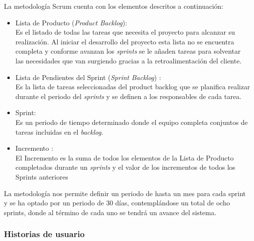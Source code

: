 \noindent La metodología Scrum cuenta con los elementos descritos a continuación:

\begin{itemize}
	\item Lista de Producto (\textit{Product Backlog}):\\
	Es el listado de todas las tareas que necesita el proyecto para alcanzar su realización. Al iniciar el desarrollo del
	proyecto esta lista no se encuentra completa y conforme avanzan los \textit{sprints} se le añaden tareas para solventar las necesidades que	van surgiendo gracias a la retroalimentación del cliente.
	\item Lista de Pendientes del Sprint (\textit{Sprint Backlog}) : \\
	Es la lista de tareas seleccionadas del product backlog que se planifica realizar durante el periodo del \textit{sprints} y se definen a los responsables de cada tarea.
	\item Sprint:\\
	Es un periodo de tiempo determinado donde el equipo completa conjuntos de tareas incluidas en el \textit{backlog}.
	\item Incremento : \\
	El Incremento es la suma de todos los elementos de la Lista de Producto completados durante un \textit{sprints} y el valor de los incrementos de todos los Sprints anteriores
\end{itemize}

La metodología nos permite definir un periodo de hasta un mes para cada sprint y se ha optado por un periodo de 30 días,
contemplándose un total de ocho sprints, donde al término de cada uno se tendrá un avance del sistema.

\subsubsection{Historias de usuario}

